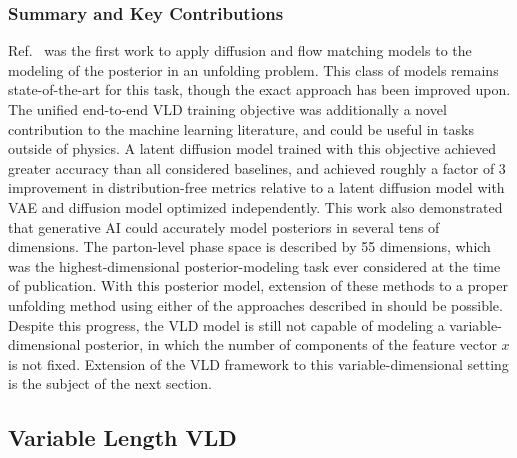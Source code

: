 \subsubsection{Summary and Key Contributions}

Ref.~\cite{Shmakov:2023kjj} was the first work to apply diffusion and flow matching models to the modeling of the posterior in an unfolding problem.
This class of models remains state-of-the-art for this task, though the exact approach has been improved upon.
The unified end-to-end VLD training objective was additionally a novel contribution to the machine learning literature, and could be useful in tasks outside of physics.
A latent diffusion model trained with this objective achieved greater accuracy than all considered baselines, and achieved roughly a factor of 3 improvement in distribution-free metrics relative to a latent diffusion model with VAE and diffusion model optimized independently.
This work also demonstrated that generative AI could accurately model posteriors in several tens of dimensions.
The parton-level phase space is described by 55 dimensions, which was the highest-dimensional posterior-modeling task ever considered at the time of publication.
With this posterior model, extension of these methods to a proper unfolding method using either of the approaches described in  should be possible.
Despite this progress, the VLD model is still not capable of modeling a variable-dimensional posterior, in which the number of components of the feature vector $x$ is not fixed.
Extension of the VLD framework to this variable-dimensional setting is the subject of the next section.

\subsection{Variable Length VLD}
\label{sec:vl-vld}

